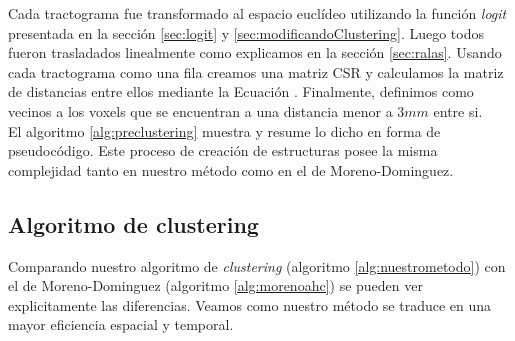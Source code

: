 Cada tractograma fue transformado al espacio eucl\'ideo utilizando la 
funci\'on \textit{logit} presentada en la secci\'on \ref{sec:logit} y 
\ref{sec:modificandoClustering}. Luego todos fueron trasladados linealmente
como explicamos en la secci\'on \ref{sec:ralas}. Usando cada tractograma
como una fila creamos una matriz CSR y calculamos la matriz de distancias
entre ellos mediante la Ecuaci\'on \label{eq:simileuc}. Finalmente,
definimos como vecinos a los voxels que se encuentran a una distancia
menor a $3mm$ entre si. \\  

El algoritmo \ref{alg:preclustering} muestra y resume lo dicho en forma de
pseudoc\'odigo. Este proceso de creaci\'on de estructuras posee la misma
complejidad tanto en nuestro m\'etodo como en el de Moreno-Dominguez. \\

\subsection{Algoritmo de clustering}
\label{sec:nuestro_clustering}

Comparando nuestro algoritmo de \textit{clustering} 
(algoritmo \ref{alg:nuestrometodo}) con el de Moreno-Dominguez 
(algoritmo \ref{alg:morenoahc}) se pueden ver explicitamente las
diferencias. Veamos como nuestro m\'etodo se traduce en una mayor
eficiencia espacial y temporal. \\

\settowidth{}
\addtolength\mylen{\parindent}

